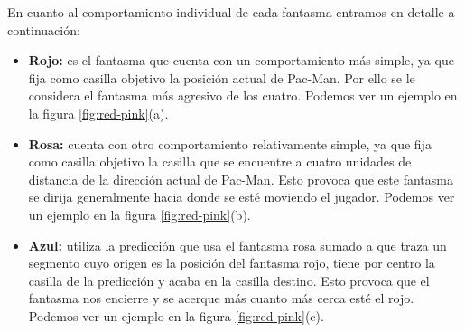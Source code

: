 En cuanto al comportamiento individual de cada fantasma entramos en detalle a continuación:

\begin{itemize}
    \item \textbf{Rojo:} es el fantasma que cuenta con un comportamiento más simple, ya que fija como casilla objetivo la posición actual de Pac-Man. Por ello se le considera el fantasma más agresivo de los cuatro. Podemos ver un ejemplo en la figura \ref{fig:red-pink}(a).
    \item \textbf{Rosa:} cuenta con otro comportamiento relativamente simple, ya que fija como casilla objetivo la casilla que se encuentre a cuatro unidades de distancia de la dirección actual de Pac-Man. Esto provoca que este fantasma se dirija generalmente hacia donde se esté moviendo el jugador. Podemos ver un ejemplo en la figura \ref{fig:red-pink}(b).
    \item \textbf{Azul:} utiliza la predicción que usa el fantasma rosa sumado a que traza un segmento cuyo origen es la posición del fantasma rojo, tiene por centro la casilla de la predicción y acaba en la casilla destino. Esto provoca que el fantasma nos encierre y se acerque más cuanto más cerca esté el rojo. Podemos ver un ejemplo en la figura \ref{fig:red-pink}(c).
    

\end{itemize}
